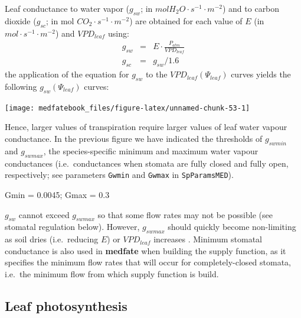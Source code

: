 \documentclass[]{book}
\newenvironment{Shaded}{\begin{snugshade}}{\end{snugshade}}
\newcommand{\FloatTok}[1]{\textcolor[rgb]{0.00,0.00,0.81}{#1}}
\newcommand{\StringTok}[1]{\textcolor[rgb]{0.31,0.60,0.02}{#1}}
\newcommand{\NormalTok}[1]{#1}
\begin{document}
Leaf conductance to water vapor (\(g_{sw}\); in \(mol H_2O \cdot s^{-1} \cdot m^{-2}\)) and to carbon dioxide (\(g_{sc}\); in mol \(CO_{2} \cdot s^{-1} \cdot m^{-2}\)) are obtained for each value of \(E\) (in \(mol \cdot s^{-1} \cdot m^{-2}\)) and \(VPD_{leaf}\) using:
\begin{eqnarray}
g_{sw} &=& E \cdot \frac{P_{atm}}{VPD_{leaf}}\\
g_{sc} &=& g_{sw}/1.6
\end{eqnarray}
the application of the equation for \(g_{sw}\) to the \(VPD_{leaf}(\Psi_{leaf})\) curves yields the following \(g_{sw}(\Psi_{leaf})\) curves:

\begin{center}\texttt{[image: medfatebook\_files/figure-latex/unnamed-chunk-53-1]} \end{center}

Hence, larger values of transpiration require larger values of leaf water vapour conductance. In the previous figure we have indicated the thresholds of \(g_{swmin}\) and \(g_{swmax}\), the species-specific minimum and maximum water vapour conductances (i.e.~conductances when stomata are fully closed and fully open, respectively; see parameters \texttt{Gwmin} and \texttt{Gwmax} in \texttt{SpParamsMED}).

\begin{Shaded}
\begin{Highlighting}[]
\NormalTok{Gmin =}\StringTok{ }\FloatTok{0.0045}\NormalTok{;}
\NormalTok{Gmax =}\StringTok{ }\FloatTok{0.3}
\end{Highlighting}
\end{Shaded}

\(g_{sw}\) cannot exceed \(g_{swmax}\) so that some flow rates may not be possible (see stomatal regulation below). However, \(g_{swmax}\) should quickly become non-limiting as soil dries (i.e.~reducing \(E\)) or \(VPD_{leaf}\) increases \citep{Sperry2016}. Minimum stomatal conductance is also used in \textbf{medfate} when building the supply function, as it specifies the minimum flow rates that will occur for completely-closed stomata, i.e.~the minimum flow from which supply function is build.

\hypertarget{leaf-photosynthesis}{%
\subsection{Leaf photosynthesis}\label{leaf-photosynthesis}}
\end{document}
